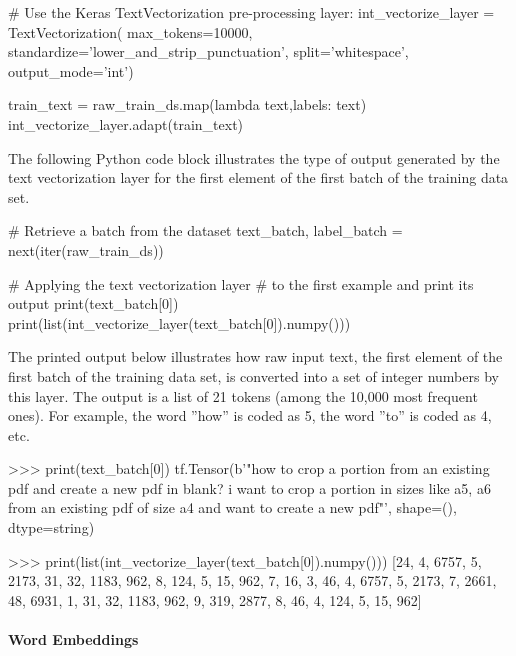 \begin{samepage}
\begin{pythoncode}
# Use the Keras TextVectorization pre-processing layer:
int_vectorize_layer = TextVectorization(
    max_tokens=10000,
    standardize='lower_and_strip_punctuation',
    split='whitespace',
    output_mode='int')
    
train_text = raw_train_ds.map(lambda text,labels: text)
int_vectorize_layer.adapt(train_text)
\end{pythoncode}
\end{samepage}

The following Python code block illustrates the type of output generated by the text vectorization layer for the first element of the first batch of the training data set.

\begin{samepage}
\begin{pythoncode}
# Retrieve a batch from the dataset
text_batch, label_batch = next(iter(raw_train_ds))

# Applying the text vectorization layer
# to the first example and print its output
print(text_batch[0])
print(list(int_vectorize_layer(text_batch[0]).numpy()))
\end{pythoncode}
\end{samepage}

The printed output below illustrates how raw input text, the first element of the first batch of the training data set, is converted into a set of integer numbers by this layer. The output is a list of 21 tokens (among the 10,000 most frequent ones). For example, the word ''how'' is coded as 5, the word ''to'' is coded as 4, etc.

\begin{samepage}
\begin{textcode}
>>> print(text_batch[0])
tf.Tensor(b'"how to crop a portion from an existing pdf and create 
a new pdf in blank? i want to crop a portion in sizes like a5, a6 
from an existing pdf of size a4 and want to create a new pdf"\n', 
shape=(), dtype=string)

>>> print(list(int_vectorize_layer(text_batch[0]).numpy()))
[24, 4, 6757, 5, 2173, 31, 32, 1183, 962, 8, 124, 5, 15, 962, 7, 16, 
3, 46, 4, 6757, 5, 2173, 7, 2661, 48, 6931, 1, 31, 32, 1183, 962, 9, 
319, 2877, 8, 46, 4, 124, 5, 15, 962]
\end{textcode}
\end{samepage}

\paragraph*{Word Embeddings}

